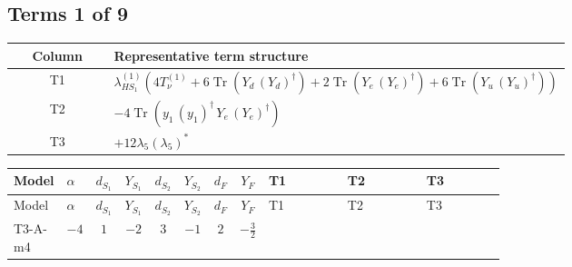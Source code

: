 \documentclass[8pt]{article}
\begin{document}
\begin{landscape}
\subsection*{Terms 1 of 9}
\begin{center}
\begin{tabular}{@{}c >{\raggedright\arraybackslash}p{0.82\linewidth}@{}}
\toprule
Column & Representative term structure \\
\midrule
T1 & \(\displaystyle {\lambda_{HS_1}^{(1)}} (4 T_{\nu}^{(1)}+6 \operatorname{Tr}\!\left({Y_d}\,\left({Y_d}\right)^{\dagger}\right)+2 \operatorname{Tr}\!\left({Y_e}\,\left({Y_e}\right)^{\dagger}\right)+6 \operatorname{Tr}\!\left({Y_u}\,\left({Y_u}\right)^{\dagger}\right))\) \\
\midrule
T2 & \(\displaystyle -4 \operatorname{Tr}\!\left({y_1}\,\left({y_1}\right)^{\dagger}\,{Y_e}\,\left({Y_e}\right)^{\dagger}\right)\) \\
\midrule
T3 & \(\displaystyle +12 {\lambda_5} \left({\lambda_5}\right)^{*}\) \\
\midrule
\bottomrule
\end{tabular}
\end{center}
\smallskip
\tiny
\begin{longtable}{@{}llcccccc >{\raggedright\arraybackslash}p{0.21\linewidth} >{\raggedright\arraybackslash}p{0.21\linewidth} >{\raggedright\arraybackslash}p{0.21\linewidth}@{}}
\toprule
Model & $\alpha$ & $d_{S_1}$ & $Y_{S_1}$ & $d_{S_2}$ & $Y_{S_2}$ & $d_F$ & $Y_F$ & T1 & T2 & T3 \\
\midrule
\endfirsthead
\toprule
Model & $\alpha$ & $d_{S_1}$ & $Y_{S_1}$ & $d_{S_2}$ & $Y_{S_2}$ & $d_F$ & $Y_F$ & T1 & T2 & T3 \\
\midrule
\endhead
T3-A-m4 & $-4$ & $1$ & $-2$ & $3$ & $-1$ & $2$ & $-\frac{3}{2}$ & \scriptsize\adjustbox{max width=\linewidth}{$\begin{gathered} {\lambda_{HS_1}^{(1)}} (4 T_{\nu}^{(1)}+6 \operatorname{Tr}\!\left({Y_d}\,\left({Y_d}\right)^{\dagger}\right)+2 \operatorname{Tr}\!\left({Y_e}\,\left({Y_e}\right)^{\dagger}\right)+6 \operatorname{Tr}\!\left({Y_u}\,\left({Y_u}\right)^{\dagger}\right))\end{gathered}$} & \scriptsize\adjustbox{max width=\linewidth}{$\begin{gathered} -4 \operatorname{Tr}\!\left({y_1}\,\left({y_1}\right)^{\dagger}\,{Y_e}\,\left({Y_e}\right)^{\dagger}\right)\end{gathered}$} & \scriptsize\adjustbox{max width=\linewidth}{$\begin{gathered} +12 {\lambda_5} \left({\lambda_5}\right)^{*}\end{gathered}$} \\

\end{longtable}
\end{landscape}
\end{document}
